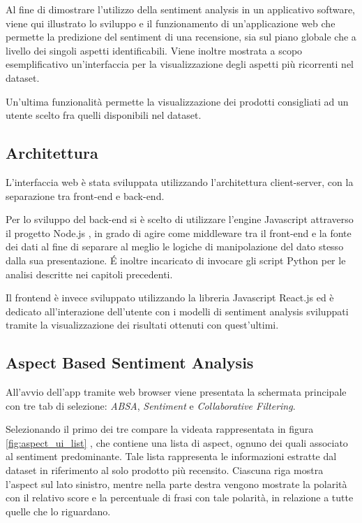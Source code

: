 \documentclass[hidelinks, 12pt]{article}
\begin{document}
Al fine di dimostrare l'utilizzo della sentiment analysis in un applicativo software, viene qui illustrato lo sviluppo e il funzionamento di un'applicazione web che permette la predizione del sentiment di una recensione, sia sul piano globale che a livello dei singoli aspetti identificabili. Viene inoltre mostrata a scopo esemplificativo un'interfaccia per la visualizzazione degli aspetti più ricorrenti nel dataset.

Un'ultima funzionalità permette la visualizzazione dei prodotti consigliati ad un utente scelto fra quelli disponibili nel dataset.



\subsection{Architettura}

L'interfaccia web è stata sviluppata utilizzando l'architettura client-server, con la separazione tra front-end e back-end.

Per lo sviluppo del back-end si è scelto di utilizzare l'engine Javascript attraverso il progetto Node.js \cite{site:nodejs}, in grado di agire come middleware tra il front-end e la fonte dei dati al fine di separare al meglio le logiche di manipolazione del dato stesso dalla sua presentazione. \'E inoltre incaricato di invocare gli script Python per le analisi descritte nei capitoli precedenti.

Il frontend è invece sviluppato utilizzando la libreria Javascript React.js \cite{site:react} ed è dedicato all'interazione dell'utente con i modelli di sentiment analysis sviluppati tramite la visualizzazione dei risultati ottenuti con quest'ultimi.



\subsection{Aspect Based Sentiment Analysis}
\label{sec:ui_abas}

All'avvio dell'app tramite web browser viene presentata la schermata principale con tre tab di selezione: {\it ABSA}, {\it Sentiment} e {\it Collaborative Filtering}.

Selezionando il primo dei tre compare la videata rappresentata in figura \ref{fig:aspect_ui_list} , che contiene una lista di aspect, ognuno dei quali associato al sentiment predominante. Tale lista rappresenta le informazioni estratte dal dataset in riferimento al solo prodotto più recensito. Ciascuna riga mostra l'aspect sul lato sinistro, mentre nella parte destra vengono mostrate la polarità con il relativo score e la percentuale di frasi con tale polarità, in relazione a tutte quelle che lo riguardano. 
\end{document}
